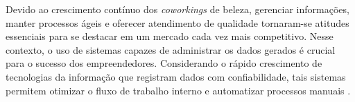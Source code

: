 
Devido ao crescimento contínuo dos \emph{coworkings} de beleza, gerenciar informações, manter processos ágeis e oferecer atendimento de qualidade tornaram-se atitudes essenciais para se destacar em um mercado cada vez mais competitivo. Nesse contexto, o uso de sistemas capazes de administrar os dados gerados é crucial para o sucesso dos empreendedores. Considerando o rápido crescimento de tecnologias da informação que registram dados com confiabilidade, tais sistemas permitem otimizar o fluxo de trabalho interno e automatizar processos manuais \cite{sebraesc2025}.



	

%
